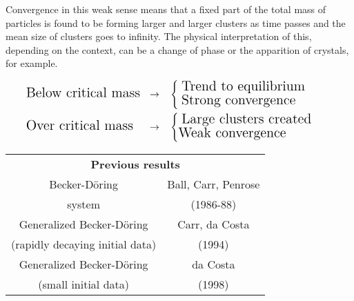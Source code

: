 \documentclass{article}
\def\to{\rightarrow}
\begin{document}
\begin{multicols}{3}
Convergence in this weak sense means that a fixed part of the total
mass of particles is found to be forming larger and larger clusters as
time passes and the mean size of clusters goes to infinity. The
physical interpretation of this, depending on the context, can be a
change of phase or the apparition of crystals, for example.

\noindent
\begin{center}
  \noindent
  \colorbox{marronrp3}{
    \begin{minipage}[t]{.96\linewidth}
      \begin{align*}
        & \text{\Large Below critical mass}
        &\to \quad
        &\begin{cases}
          \text{ \Large Trend to equilibrium }\\
          \text{ \Large Strong convergence }
        \end{cases}
        &
        \\
        &\text{\Large Over critical mass }
        &\to \quad
        &\begin{cases}
          \text{ \Large Large clusters created}\\
          \text{\Large Weak convergence }
        \end{cases}
        &
      \end{align*}
    \end{minipage}
  }
\end{center}

\begin{center}  

\vspace{.5cm}

\Large
\begin{tabular}[t]{c|c}
  \multicolumn{2}{c}{\huge \textbf{Previous results}}
  \vspace{.3cm}
  \\
  Becker-Döring& Ball, Carr, Penrose\\
  system       & \cite{BCP86,BC88} (1986-88)\\
  \hline
  Generalized Becker-Döring &Carr, da Costa\\
  (rapidly decaying initial data) &\cite{CdC94} (1994)\\
  \hline
  Generalized Becker-Döring & da Costa \\
  (small initial data) & \cite{dC98} (1998)
\end{tabular}
\end{center}




\end{multicols}
\end{document}
